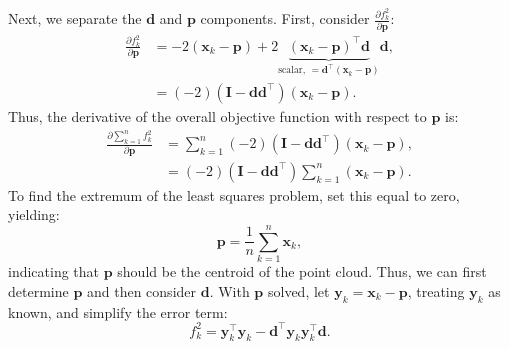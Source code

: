 Next, we separate the $\mathbf{d}$ and $\mathbf{p}$ components. First, consider $\frac{\partial f^2_k}{\partial \mathbf{p}}$:
\begin{align}\label{key}
	\frac{\partial f^2_k}{\partial \mathbf{p}} &= -2(\mathbf{x}_k - \mathbf{p}) + 2 \underbrace{(\mathbf{x}_k - \mathbf{p})^\top \mathbf{d}}_{\text{scalar, }=\mathbf{d}^\top (\mathbf{x}_k - \mathbf{p})} \mathbf{d}, \\
	&= (-2) (\mathbf{I} - \mathbf{d} \mathbf{d}^\top) (\mathbf{x}_k - \mathbf{p}).
\end{align}
Thus, the derivative of the overall objective function with respect to $\mathbf{p}$ is:
\begin{align}\label{key}
	\frac{\partial \sum_{k=1}^{n} f_k^2}{\partial \mathbf{p}} &= \sum_{k=1}^{n} (-2) (\mathbf{I} - \mathbf{d} \mathbf{d}^\top) (\mathbf{x}_k - \mathbf{p}), \\ 
	&= (-2) (\mathbf{I} - \mathbf{d} \mathbf{d}^\top) \sum_{k=1}^n (\mathbf{x}_k - \mathbf{p}).
\end{align}
To find the extremum of the least squares problem, set this equal to zero, yielding:
\begin{equation}
	\mathbf{p} = \frac{1}{n} \sum_{k=1}^n \mathbf{x}_k,
\end{equation}
indicating that $\mathbf{p}$ should be the centroid of the point cloud. Thus, we can first determine $\mathbf{p}$ and then consider $\mathbf{d}$. With $\mathbf{p}$ solved, let $\mathbf{y}_k = \mathbf{x}_k - \mathbf{p}$, treating $\mathbf{y}_k$ as known, and simplify the error term:
\begin{equation}\label{eq.6.24}
	f_k^2 = \mathbf{y}_k^\top \mathbf{y}_k - \mathbf{d}^\top \mathbf{y}_k \mathbf{y}_k^\top \mathbf{d}.
\end{equation}

